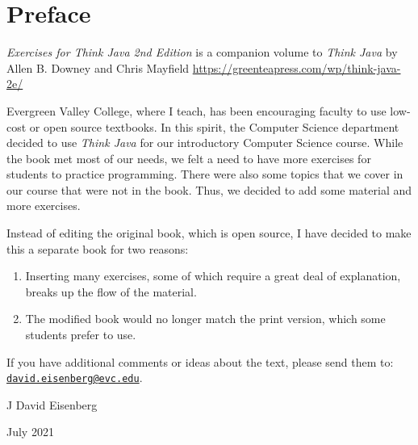 \chapter*{Preface}


{\it Exercises for Think Java 2nd Edition} is a companion volume to {\it Think Java} by Allen B. Downey and Chris Mayfield 
\url{https://greenteapress.com/wp/think-java-2e/}

Evergreen Valley College, where I teach, has been encouraging faculty to use low-cost or open source textbooks. In this spirit, the Computer Science department decided to use {\it Think Java} for our introductory Computer Science course. While the book met most of our needs, we felt a need to have more exercises for students to practice programming. There were also some topics that we cover in our course that were not in the book. Thus, we decided to add some material and more exercises.

Instead of editing the original book, which is open source, I have decided to make this a separate book for two reasons:

\begin{enumerate}
\item Inserting many exercises, some of which require a great deal of explanation, breaks up the flow of the material. 
\item The modified book would no longer match the print version, which some students prefer to use.
\end{enumerate}


If you have additional comments or ideas about the text, please send them to: \href{mailto:david.eisenberg@evc.edu}{\tt david.eisenberg@evc.edu}.

\hfill J David Eisenberg

\hfill July 2021
